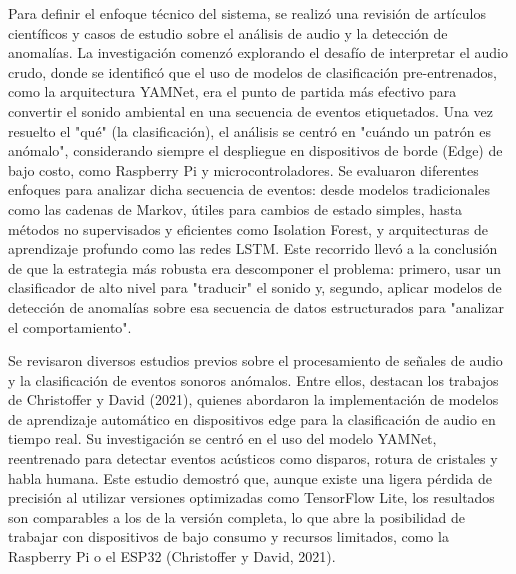 

Para definir el enfoque técnico del sistema, se realizó una revisión de artículos científicos y casos de estudio sobre el análisis de audio y la detección de anomalías. La investigación comenzó explorando el desafío de interpretar el audio crudo, donde se identificó que el uso de modelos de clasificación pre-entrenados, como la arquitectura YAMNet, era el punto de partida más efectivo para convertir el sonido ambiental en una secuencia de eventos etiquetados. Una vez resuelto el "qué" (la clasificación), el análisis se centró en "cuándo un patrón es anómalo", considerando siempre el despliegue en dispositivos de borde (Edge) de bajo costo, como Raspberry Pi y microcontroladores. Se evaluaron diferentes enfoques para analizar dicha secuencia de eventos: desde modelos tradicionales como las cadenas de Markov, útiles para cambios de estado simples, hasta métodos no supervisados y eficientes como Isolation Forest, y arquitecturas de aprendizaje profundo como las redes LSTM. Este recorrido llevó a la conclusión de que la estrategia más robusta era descomponer el problema: primero, usar un clasificador de alto nivel para "traducir" el sonido y, segundo, aplicar modelos de detección de anomalías sobre esa secuencia de datos estructurados para "analizar el comportamiento".


Se revisaron diversos estudios previos sobre el procesamiento de señales de audio y la clasificación de eventos sonoros anómalos. Entre ellos, destacan los trabajos de Christoffer y David (2021), quienes abordaron la implementación de modelos de aprendizaje automático en dispositivos edge para la clasificación de audio en tiempo real. Su investigación se centró en el uso del modelo YAMNet, reentrenado para detectar eventos acústicos como disparos, rotura de cristales y habla humana. Este estudio demostró que, aunque existe una ligera pérdida de precisión al utilizar versiones optimizadas como TensorFlow Lite, los resultados son comparables a los de la versión completa, lo que abre la posibilidad de trabajar con dispositivos de bajo consumo y recursos limitados, como la Raspberry Pi o el ESP32 (Christoffer y David, 2021).


